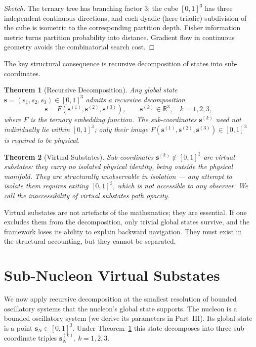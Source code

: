 \documentclass[11pt,a4paper]{article}
\newtheorem{theorem}{Theorem}[section]
\theoremstyle{definition}
\theoremstyle{remark}
\newcommand{\Real}{\mathbb{R}}
\begin{document}
\begin{proof}[Sketch]
The ternary tree has branching factor 3; the cube $[0,1]^3$ has three independent continuous directions, and each dyadic (here triadic) subdivision of the cube is isometric to the corresponding partition depth. Fisher information metric turns partition probability into distance. Gradient flow in continuous geometry avoids the combinatorial search cost.
\end{proof}

The key structural consequence is recursive decomposition of states into sub-coordinates.

\begin{theorem}[Recursive Decomposition]
\label{thm:recdec}
Any global state $\mathbf{s} = (s_1,s_2,s_3)\in[0,1]^3$ admits a recursive decomposition
\[
\mathbf{s} = F(\mathbf{s}^{(1)}, \mathbf{s}^{(2)}, \mathbf{s}^{(3)}),\qquad \mathbf{s}^{(k)}\in\Real^3,\quad k=1,2,3,
\]
where $F$ is the ternary embedding function. The sub-coordinates $\mathbf{s}^{(k)}$ need not individually lie within $[0,1]^3$; only their image $F(\mathbf{s}^{(1)},\mathbf{s}^{(2)},\mathbf{s}^{(3)})\in[0,1]^3$ is required to be physical.
\end{theorem}

\begin{theorem}[Virtual Substates]
\label{thm:virt}
Sub-coordinates $\mathbf{s}^{(k)}\notin[0,1]^3$ are \emph{virtual substates}: they carry no isolated physical identity, being outside the physical manifold. They are structurally \emph{unobservable in isolation} --- any attempt to isolate them requires exiting $[0,1]^3$, which is not accessible to any observer. We call the inaccessibility of virtual substates \emph{path opacity}.
\end{theorem}

Virtual substates are not artefacts of the mathematics; they are essential. If one excludes them from the decomposition, only trivial global states survive, and the framework loses its ability to explain backward navigation. They must exist in the structural accounting, but they cannot be separated.

\section{Sub-Nucleon Virtual Substates}
\label{sec:subnuc}

We now apply recursive decomposition at the smallest resolution of bounded oscillatory systems that the nucleon's global state supports. The nucleon is a bounded oscillatory system (we derive its parameters in Part~III). Its global state is a point $\mathbf{s}_N\in[0,1]^3$. Under Theorem~\ref{thm:recdec} this state decomposes into three sub-coordinate triples $\mathbf{s}_N^{(k)}$, $k=1,2,3$.
\end{document}
